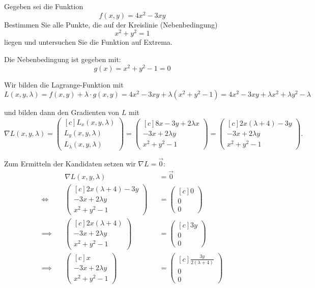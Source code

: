 \documentclass[answers]{exam}
\newcommand{\vektor}[1]{\begin{pmatrix*}[c] #1 \end{pmatrix*}}
\begin{document}
\begin{questions}
    \newpage

    \question
    Gegeben sei die Funktion
    $$
        f(x, y) = 4x^2 -3xy
    $$
    Bestimmen Sie alle Punkte, die auf der Kreislinie (Nebenbedingung)
    $$
        x^2 + y^2 = 1
    $$
    liegen und untersuchen Sie die Funktion auf Extrema.
    \begin{solution}
        Die Nebenbedingung ist gegeben mit:
        $$
            g(x) = x^2 + y^2 -1 = 0
        $$

        Wir bilden die Lagrange-Funktion mit
        $$
            L(x, y, \lambda) = f(x, y) + \lambda \cdot g(x, y) = 4x^2 -3xy + \lambda (x^2 + y^2 -1) = 4x^2 -3xy + \lambda x^2 + \lambda y^2 - \lambda
        $$

        und bilden dann den Gradienten von $L$ mit
        $$
            \nabla L(x, y, \lambda) = \vektor{L_x(x, y, \lambda) \\ L_y(x, y, \lambda) \\ L_\lambda(x, y, \lambda)} = \vektor{8x -3y + 2\lambda x \\ -3x + 2\lambda y \\ x^2 + y^2 - 1}= \vektor{2x(\lambda + 4) -3y \\ -3x + 2\lambda y \\ x^2 + y^2 - 1}.
        $$

        Zum Ermitteln der Kandidaten setzen wir $\nabla L = \vec{0}$:
        $$
            \begin{aligned}
                               & \nabla L(x, y, \lambda)     &  & = \vec{0} \\
                \iff \quad     & \vektor{2x(\lambda + 4) -3y                \\ -3x + 2\lambda y \\ x^2 + y^2 - 1} && = \vektor{0 \\ 0 \\ 0} \\
                \implies \quad & \vektor{2x(\lambda + 4)                    \\ -3x + 2\lambda y \\ x^2 + y^2 - 1} && = \vektor{3y \\ 0 \\ 0} \\
                \implies \quad & \vektor{x                                  \\ -3x + 2\lambda y \\ x^2 + y^2 - 1} && = \vektor{\frac{3y}{2(\lambda + 4)} \\ 0 \\ 0} \\
            \end{aligned}
        $$


\end{solution}
\end{questions}
\end{document}
